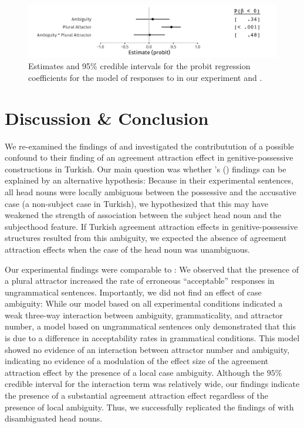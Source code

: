 \documentclass[]{interact}
\theoremstyle{plain}%
\theoremstyle{definition}
\theoremstyle{remark}
\begin{document}
\begin{figure}[hbt!]
\centering


\includegraphics[width=\linewidth]{ResponseModelUngram-1.jpg} 



\caption{Estimates and 95\% credible intervals for the probit regression coefficients for the model of responses to  in our experiment and \citet{LagoEtAl:2019}.}
\label{fig:ResponseModelUngram}
\end{figure}


\section{Discussion \& Conclusion}

We re-examined the findings of \citet{LagoEtAl:2019} and investigated the contributution of a possible confound to their finding of an agreement attraction effect in genitive-possessive constructions in Turkish. Our main question was whether \citeauthor{LagoEtAl:2019}'s (\citeyear{LagoEtAl:2019}) findings can be explained by an alternative hypothesis: 
Because in their experimental sentences, all head nouns were locally ambiguous between the possessive and the accusative case (a non-subject case in Turkish), we hypothesized that this may have weakened the strength of association between the subject head noun and the subjecthood feature.
If Turkish agreement attraction effects in genitive-possessive structures resulted from this ambiguity, we expected the absence of agreement attraction effects when the case of the head noun was unambiguous.  

Our experimental findings were comparable to \citet{LagoEtAl:2019}: We observed that the presence of a plural attractor increased the rate of erroneous ``acceptable'' responses  
in ungrammatical sentences.
Importantly, we did not find an effect of case ambiguity: While our model based on all experimental conditions indicated a weak three-way interaction between ambiguity, grammaticality, and attractor number, a model based on ungrammatical sentences only demonstrated that this is due to a difference in acceptability rates in grammatical conditions. This model showed no evidence of an interaction between attractor number and ambiguity, indicating no evidence of a modulation of the effect size of the agreement attraction effect by the presence of a local case ambiguity. 
Although the $95\%$ credible interval for the interaction term was relatively wide, our findings indicate the presence of a substantial agreement attraction effect regardless of the presence of local ambiguity.
Thus, we successfully replicated the findings of \citet{LagoEtAl:2019} with disambiguated head nouns. 
\end{document}
